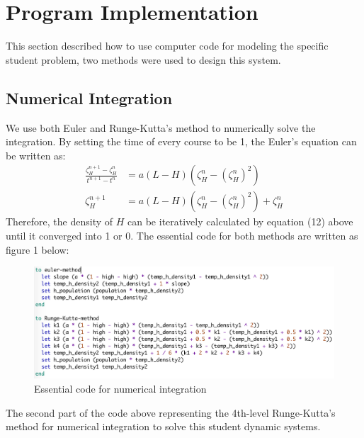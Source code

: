 \documentclass[a4paper, 12pt]{article}
\begin{document}
\section{Program Implementation}
This section described how to use computer code for modeling the specific student problem, two methods were used to design this system. 
\subsection{Numerical Integration}
We use both Euler and Runge-Kutta's method to numerically solve the integration. By setting the time of every course to be 1, the Euler's equation can be written as:
\vspace{-3mm}
\begin{equation}
\begin{split}
	\frac{\zeta_{H}^{n+1}-\zeta_{H}^{n}}{t^{n+1}-t^{n}} & = a(L-H)( \zeta_{H}^{n} - (\zeta_{H}^{n})^{2}) \\
	\zeta_{H}^{n+1} &=  a(L-H)( \zeta_{H}^{n} - (\zeta_{H}^{n})^{2}) + \zeta_{H}^{n}
\end{split}
\end{equation}
Therefore, the density of $H$ can be iteratively calculated by equation (12) above until it converged into 1 or 0. The essential code for both methods are written as figure 1 below:
\begin{figure}[!h]
  \centering
  \includegraphics[width=6in]{./figures/code}
  \vspace{-3mm}
  \caption{\footnotesize Essential code for numerical integration}
  \label{integrate}
\end{figure}
\par The second part of the code above representing the 4th-level Runge-Kutta's method for numerical integration to solve this student dynamic systems.
\end{document}
